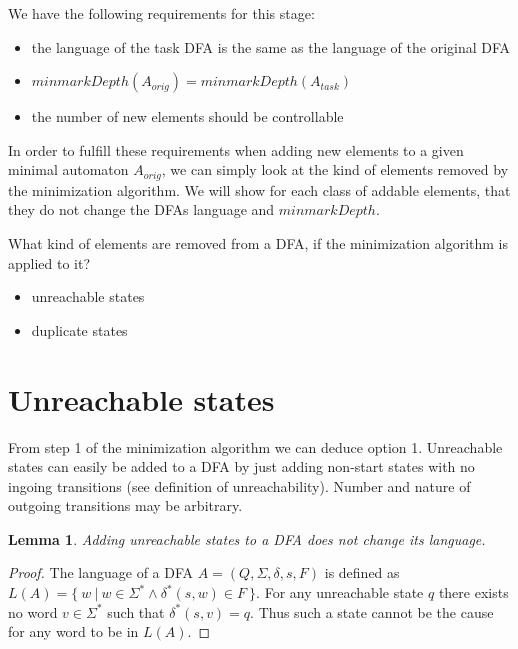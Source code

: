 \documentclass[a4paper, oneside, 11pt]{report}
\newtheorem{lemma}{Lemma}
\theoremstyle{definition}
\theoremstyle{remark}
\begin{document}
%		
%
%
%

We have the following requirements for this stage:
\begin{itemize}
	\item the language of the task DFA is the same as the language of the original DFA
	\item $minmarkDepth(A_{orig}) = minmarkDepth(A_{task})$
	\item the number of new elements should be controllable
\end{itemize}
In order to fulfill these requirements when adding new elements to a given minimal automaton $A_{orig}$, we can simply look at the kind of elements removed by the minimization algorithm. We will show for each class of addable elements, that they do not change the DFAs language and $minmarkDepth$.

What kind of elements are removed from a DFA, if the minimization algorithm is applied to it?
\begin{itemize}
	\item unreachable states
	\item duplicate states
\end{itemize}

\section{Unreachable states}

From step 1 of the minimization algorithm we can deduce option 1. Unreachable states can easily be added to a DFA by just adding non-start states with no ingoing transitions (see definition of unreachability). Number and nature of outgoing transitions may be arbitrary.

\begin{lemma}
	Adding unreachable states to a DFA does not change its language.
\end{lemma}
\begin{proof}
	The language of a DFA $A = (Q, \Sigma, \delta, s, F)$ is defined as $L(A) = \{\ w\ |\ w \in \Sigma^* \land \delta^*(s, w) \in F\ \}$. For any unreachable state $q$ there exists no word $v \in \Sigma^*$ such that $\delta^*(s,v) = q$. Thus such a state cannot be the cause for any word to be in $L(A)$.
\end{proof}
\end{document}
